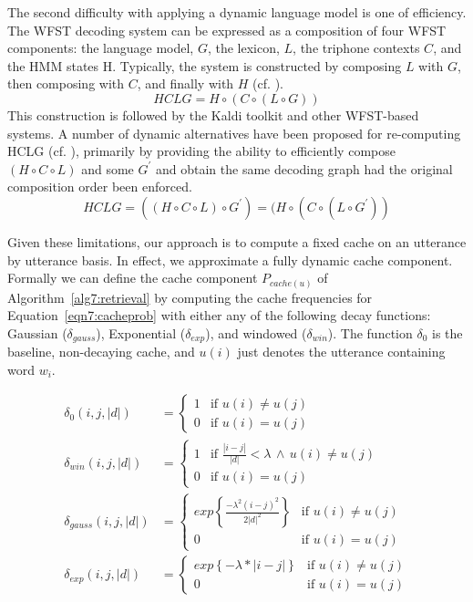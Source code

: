 The second difficulty with applying a dynamic language model is one of efficiency.  The WFST decoding system can be expressed as a composition of four WFST components:  the language model, $G$, the lexicon, $L$, the triphone contexts $C$, and the HMM states H. Typically, the system is constructed by composing $L$ with $G$, then composing with $C$, and finally with $H$  (cf. \cite{mohri2002weighted}).  
\begin{equation}
HCLG = H \circ ( C \circ (L \circ G)) \label{hclg1}
\end{equation}
\noindent This construction is followed by the Kaldi toolkit and other WFST-based systems.  A number of dynamic alternatives have been proposed for re-computing HCLG (cf. \cite{caseiro2002,allauzen2009}), primarily by providing the ability to efficiently compose $(H\circ C \circ L)$ and some $G^\prime$ and obtain the same decoding graph had the original composition order been enforced.
\begin{equation}
HCLG = ((H\circ C \circ L) \circ G^\prime) = (H \circ ( C \circ (L \circ G^\prime))
\end{equation}

Given these limitations, our approach is to compute a fixed cache on an utterance by utterance basis.  In effect, we approximate a fully dynamic cache component.   Formally we can define the cache component $P_{cache(u)}$ of Algorithm~\ref{alg7:retrieval} by computing the cache frequencies for Equation~\ref{eqn7:cacheprob} with either any of the following decay functions: Gaussian ($\delta_{gauss}$), Exponential ($\delta_{exp}$), and windowed ($\delta_{win}$).   The function $\delta_0$ is the baseline, non-decaying cache, and $u(i)$ just denotes the utterance containing word $w_i$.

\begin{align}
\delta_0(i,j,|d|) &=
\left\{
	\begin{array}{ll}
		1  & \mbox{if } u(i)\neq u(j)\\
		0 & \mbox{if } u(i) = u(j)
	\end{array}
\right.\\[1ex]
\delta_{win}(i,j,|d|) &= 
\left\{
	\begin{array}{ll}
		1 & \mbox{if } \frac{|i-j|}{|d|} < \lambda \,\land\, u(i) \neq u(j) \\
		0 & \mbox{if } u(i) = u(j)
	\end{array}
\right.\\[1ex]
\delta_{gauss}(i,j,|d|) &= 
\left\{
	\begin{array}{ll}
		exp\left\{\frac{-\lambda^2(i-j)^2}{2|d|^2}\right\} & \mbox{if } u(i) \neq u(j)\\
		0 & \mbox{if } u(i) = u(j)
	\end{array}
\right.\\[1ex]
\delta_{exp}(i,j,|d|) &= 
\left\{
	\begin{array}{ll}
		exp\left\{-\lambda*|i-j|\right\} & \mbox{if } u(i) \neq u(j)\\
		0 & \mbox{if } u(i) = u(j)
	\end{array}
\right.
\end{align}

